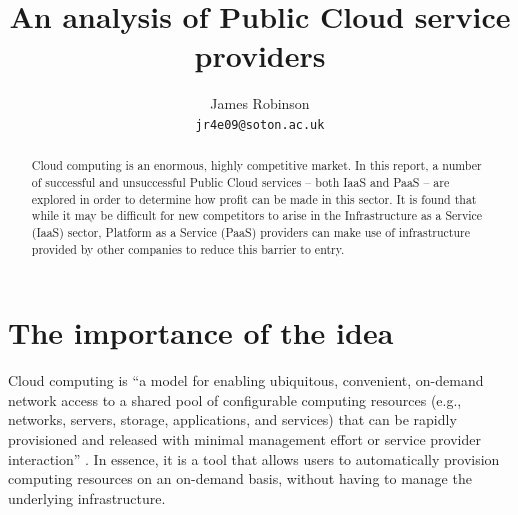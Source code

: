 \documentclass[a4paper]{proc}
\begin{document}
  \title{An analysis of Public Cloud service providers}
  \author{James Robinson\\\texttt{jr4e09@soton.ac.uk}}
  \maketitle

  \begin{abstract}
    Cloud computing is an enormous, highly competitive market. In this report, a number of successful and unsuccessful Public Cloud services -- both IaaS and PaaS -- are explored in order to determine how profit can be made in this sector. It is found that while it may be difficult for new competitors to arise in the Infrastructure as a Service (IaaS) sector, Platform as a Service (PaaS) providers can make use of infrastructure provided by other companies to reduce this barrier to entry.
  \end{abstract}


  \section{The importance of the idea}
  \label{sec:idea}


  Cloud computing is ``a model for enabling ubiquitous, convenient, on-demand network access to a shared pool of configurable computing resources (e.g., networks, servers, storage, applications, and services) that can be rapidly provisioned and released with minimal management effort or service provider interaction'' \cite{Mell2011}. In essence, it is a tool that allows users to automatically provision computing resources on an on-demand basis, without having to manage the underlying infrastructure.
\end{document}
